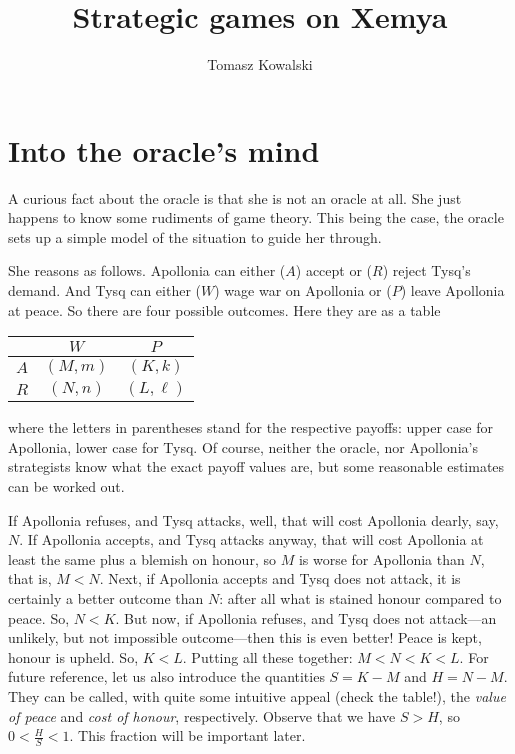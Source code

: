 \documentclass{amsart}
\title{Strategic games on Xemya}
\author{Tomasz Kowalski}
\begin{document}
\maketitle


\section{Into the oracle's mind}


A curious fact about the oracle is that she is not an oracle at all. She just
happens to know some rudiments of game theory. This being the case, the
oracle sets up a simple model of the situation to guide her through.   

\bigskip

She reasons as follows. Apollonia can either ($A$) accept or ($R$) reject Tysq's
demand. And Tysq can either ($W$) wage war on Apollonia or 
($P$) leave Apollonia at peace. So there are four possible outcomes. 
Here they are as a table
\begin{center}
\begin{tabular}{c|cc}
  & $W$      & $P$ \\
\hline
$A$ & $(M,m)$  & $(K,k)$  \\
$R$ & $(N,n)$  & $(L,\ell)$  
\end{tabular}
\end{center}
where the letters in parentheses stand for the respective payoffs:
upper case for Apollonia, lower case for Tysq. 
Of course, neither the oracle, nor Apollonia's strategists know what the exact payoff
values are, but some reasonable estimates can be worked out. 

If Apollonia refuses, and Tysq attacks, well, 
that will cost Apollonia dearly, say, $N$. If Apollonia accepts, and Tysq attacks
anyway, that will cost Apollonia at least the same plus a blemish
on honour, so $M$ is worse
for Apollonia than $N$, that is, $M < N$. 
Next, if Apollonia accepts and Tysq does not attack, it is certainly a better
outcome than $N$: after all what is stained honour compared to peace. So, $N < K$. 
But now, if Apollonia refuses, and Tysq does not attack---an unlikely, but
not impossible outcome---then this is even better! Peace is kept, honour is
upheld. So, $K < L$. Putting all these together: $M<N<K<L$. For future
reference, let us also introduce the quantities $S = K-M$ and 
$H = N-M$. They can be called, with quite some intuitive appeal 
(check the table!), the \emph{value of peace} and \emph{cost of honour}, respectively. 
Observe that we have $S>H$, so $0<\frac{H}{S} <1$. 
This fraction will be important later. 
\end{document}
